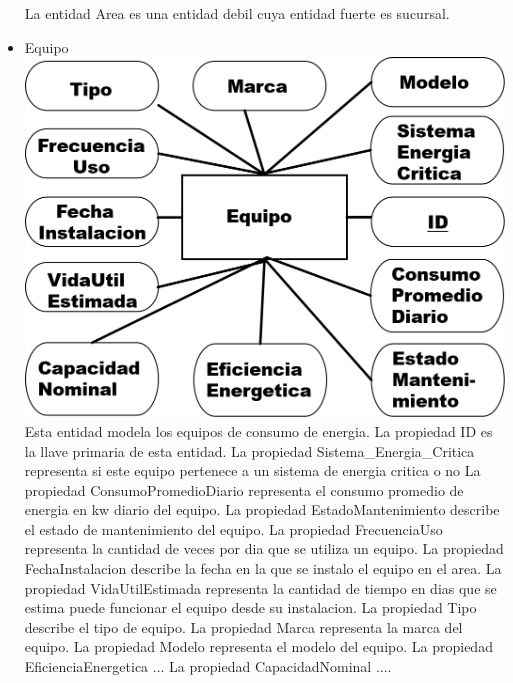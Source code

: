 \documentclass{article}
\begin{document}
\begin{itemize}
La entidad Area es una entidad debil cuya entidad fuerte es sucursal.
\item Equipo
\includegraphics[scale=0.25]{Imagenes/Informe1/EntidadEquipo.png}
Esta entidad modela los equipos de consumo de energia.
La propiedad ID es la llave primaria de esta entidad.
La propiedad Sistema\_Energia\_Critica representa si este equipo pertenece a un sistema de energia critica o no
La propiedad ConsumoPromedioDiario representa el consumo promedio de energia en kw diario del equipo.
La propiedad EstadoMantenimiento describe el estado de mantenimiento del equipo.
La propiedad FrecuenciaUso representa la cantidad de veces por dia que se utiliza un equipo.
La propiedad FechaInstalacion describe la fecha en la que se instalo el equipo en el area.
La propiedad VidaUtilEstimada representa la cantidad de tiempo en dias que se estima puede funcionar el equipo desde su instalacion.
La propiedad Tipo describe el tipo de equipo.
La propiedad Marca representa la marca del equipo.
La propiedad Modelo representa el modelo del equipo.
La propiedad EficienciaEnergetica ...
La propiedad CapacidadNominal ....


\end{itemize}
\end{document}
